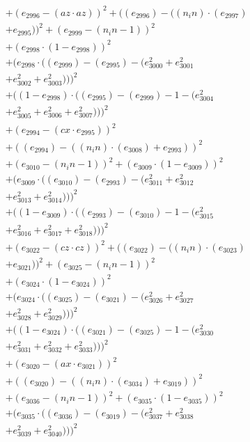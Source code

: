 \documentclass[10pt, a4paper]{article}
\begin{document}
\begin{align*}
& + (e_{2996} - (az  \cdot  az))^{2} + ((e_{2996}) - ((n_in)  \cdot  (e_{2997}) \\
& + e_{2995}))^{2} + (e_{2999} - (n_in - 1))^{2} \\
& + (e_{2998}  \cdot  (1 - e_{2998}))^{2} \\
& + (e_{2998}  \cdot  ((e_{2999}) - (e_{2995}) - (e_{3000}^{2} + e_{3001}^{2} \\
& + e_{3002}^{2} + e_{3003}^{2})))^{2} \\
& + ((1 - e_{2998})  \cdot  ((e_{2995}) - (e_{2999}) - 1 - (e_{3004}^{2} \\
& + e_{3005}^{2} + e_{3006}^{2} + e_{3007}^{2})))^{2} \\
& + (e_{2994} - (cx  \cdot  e_{2995}))^{2} \\
& + ((e_{2994}) - ((n_in)  \cdot  (e_{3008}) + e_{2993}))^{2} \\
& + (e_{3010} - (n_in - 1))^{2} + (e_{3009}  \cdot  (1 - e_{3009}))^{2} \\
& + (e_{3009}  \cdot  ((e_{3010}) - (e_{2993}) - (e_{3011}^{2} + e_{3012}^{2} \\
& + e_{3013}^{2} + e_{3014}^{2})))^{2} \\
& + ((1 - e_{3009})  \cdot  ((e_{2993}) - (e_{3010}) - 1 - (e_{3015}^{2} \\
& + e_{3016}^{2} + e_{3017}^{2} + e_{3018}^{2})))^{2} \\
& + (e_{3022} - (cz  \cdot  cz))^{2} + ((e_{3022}) - ((n_in)  \cdot  (e_{3023}) \\
& + e_{3021}))^{2} + (e_{3025} - (n_in - 1))^{2} \\
& + (e_{3024}  \cdot  (1 - e_{3024}))^{2} \\
& + (e_{3024}  \cdot  ((e_{3025}) - (e_{3021}) - (e_{3026}^{2} + e_{3027}^{2} \\
& + e_{3028}^{2} + e_{3029}^{2})))^{2} \\
& + ((1 - e_{3024})  \cdot  ((e_{3021}) - (e_{3025}) - 1 - (e_{3030}^{2} \\
& + e_{3031}^{2} + e_{3032}^{2} + e_{3033}^{2})))^{2} \\
& + (e_{3020} - (ax  \cdot  e_{3021}))^{2} \\
& + ((e_{3020}) - ((n_in)  \cdot  (e_{3034}) + e_{3019}))^{2} \\
& + (e_{3036} - (n_in - 1))^{2} + (e_{3035}  \cdot  (1 - e_{3035}))^{2} \\
& + (e_{3035}  \cdot  ((e_{3036}) - (e_{3019}) - (e_{3037}^{2} + e_{3038}^{2} \\
& + e_{3039}^{2} + e_{3040}^{2})))^{2} \\

\end{align*}
\end{document}
